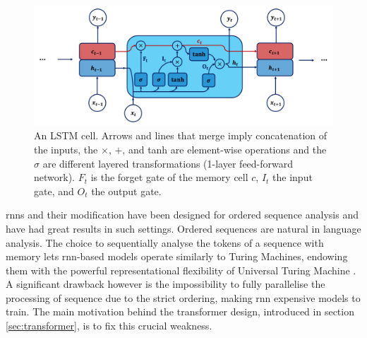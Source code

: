 \begin{figure}[h!]
    \center
    \includegraphics[scale=0.5]{Images/ML/lstm.png}
    \caption{An LSTM cell. Arrows and lines that merge imply concatenation of the inputs, the $\times$, $+$, and tanh are element-wise operations and the $\sigma$ are different layered transformations (1-layer feed-forward network). $F_t$ is the forget gate of the memory cell $c$, $I_t$ the input gate, and $O_t$ the output gate. } 
    \label{fig:lstmCell}
\end{figure}

%

\glspl{rnn} and their modification have been designed for ordered sequence analysis and have had great results in such settings. Ordered sequences are natural in language analysis. The choice to sequentially analyse the tokens of a sequence with memory lets \gls{rnn}-based models operate similarly to Turing Machines, endowing them with the powerful representational flexibility of Universal Turing Machine \cite{NEURIPS2021_ef452c63}. A significant drawback however is the impossibility to fully parallelise the processing of sequence due to the strict ordering, making \gls{rnn} expensive models to train. The main motivation behind the transformer design, introduced in section \ref{sec:transformer}, is to fix this crucial weakness.

